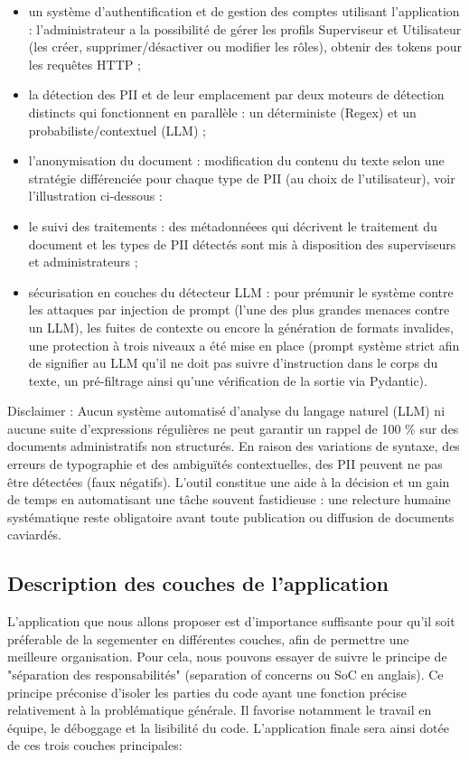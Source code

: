 \documentclass[12pt,a4paper]{article}
\begin{document}
\begin{itemize}
\item un système d'authentification et de gestion des comptes utilisant l'application : l'administrateur a la possibilité de gérer les profils Superviseur et Utilisateur (les créer, supprimer/désactiver ou modifier les rôles), obtenir des tokens pour les requêtes HTTP ;
\item la détection des PII et de leur emplacement par deux moteurs de détection distincts qui fonctionnent en parallèle : un déterministe (Regex) et un probabiliste/contextuel (LLM) ;
\item l'anonymisation du document : modification du contenu du texte selon une stratégie différenciée pour chaque type de PII (au choix de l'utilisateur), voir l'illustration ci-dessous :
\item le suivi des traitements : des métadonnéees qui décrivent le traitement du document et les types de PII détectés sont mis à disposition des superviseurs et administrateurs ;
\item sécurisation en couches du détecteur LLM : pour prémunir le système contre les attaques par injection de prompt (l'une des plus grandes menaces contre un LLM), les fuites de contexte ou encore la génération de formats invalides, une protection à trois niveaux a été mise en place (prompt système strict afin de signifier au LLM qu'il ne doit pas suivre d'instruction dans le corps du texte, un pré-filtrage ainsi qu'une vérification de la sortie via Pydantic).
\end{itemize}

Disclaimer :
Aucun système automatisé d'analyse du langage naturel (LLM) ni aucune suite d'expressions régulières ne peut garantir un rappel de 100 \% sur des documents administratifs non structurés. En raison des variations de syntaxe, des erreurs de typographie et des ambiguïtés contextuelles, des PII peuvent ne pas être détectées (faux négatifs). L'outil constitue une aide à la décision et un gain de temps en automatisant une tâche souvent fastidieuse : une relecture humaine systématique reste obligatoire avant toute publication ou diffusion de documents caviardés.

\subsection{Description des couches de l'application}

L'application que nous allons proposer est d'importance suffisante pour qu'il soit préferable de la segementer en différentes couches, afin de permettre une meilleure organisation. Pour cela, nous pouvons essayer de suivre le principe de "séparation des responsabilités" (separation of concerns ou SoC en anglais). Ce principe préconise d'isoler les parties du code ayant une fonction précise relativement à la problématique générale. Il favorise notamment le travail en équipe, le déboggage et la lisibilité du code. L'application finale sera ainsi dotée de ces trois couches principales:
\end{document}
